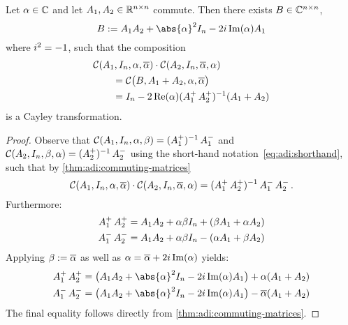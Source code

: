 \begin{lemma}
\label{thm:adi:cayley-compose}
  Let $\alpha\in\mathbb{C}$ and let $A_1, A_2 \in\mathbb{R}^{n\times n}$ commute.
  Then there exists $B\in\mathbb{C}^{n\times n}$,
  \begin{equation*}
    B := A_1A_2 + \abs{\alpha}^2 I_n - 2\im \Im(\alpha) A_1
  \end{equation*}
  where $i^2 = -1$,
  such that the composition
  \begin{align*}
    \MoveEqLeft
    \Cayley(A_1, I_n, \alpha, \conj{\alpha}) \cdot
    \Cayley(A_2, I_n, \conj{\alpha}, \alpha)
    \\
    &= \Cayley\big( B, A_1 + A_2, \alpha, \conj\alpha \big) \\
    &= I_n - 2\Re(\alpha)(\Aip\Aiip)^{-1}(A_1+A_2)
  \end{align*}
  is a Cayley transformation.
\end{lemma}
\begin{proof}
  Observe that
  $\mathcal{C}(A_1, I_n, \alpha, \beta) = \mathop{(\mathop{A_1^+})^{-1}}\mathop{A_1^-}$ and
  $\mathcal{C}(A_2, I_n, \beta, \alpha) = \mathop{(\mathop{A_2^+})^{-1}}\mathop{A_2^-}$
  using the short-hand notation~\eqref{eq:adi:shorthand},
  such that by \autoref{thm:adi:commuting-matrices}
  \begin{equation*}
    \Cayley(A_1, I_n, \alpha, \conj{\alpha})
    \cdot
    \Cayley(A_2, I_n, \conj{\alpha}, \alpha)
    =
    (\Aip\Aiip)^{-1} \Aim\Aiim
    .
  \end{equation*}
  Furthermore:
  \begin{align*}
    \mathop{A_1^+}\mathop{A_2^+} &= A_1A_2 + \alpha\beta I_n + (\beta A_1 + \alpha A_2) \\
    \mathop{A_1^-}\mathop{A_2^-} &= A_1A_2 + \alpha\beta I_n - (\alpha A_1 + \beta A_2)
  \end{align*}
  Applying $\beta := \conj\alpha$ as well as $\alpha = \conj\alpha + 2\im\Im(\alpha)$ yields:
  \begin{align*}
    \Aip\Aiip &= \big(A_1A_2 + \abs{\alpha}^2 I_n - 2\im\Im(\alpha)A_1\big) + \alpha (A_1+A_2) \\
    \Aim\Aiim &= \big(A_1A_2 + \abs{\alpha}^2 I_n - 2\im\Im(\alpha)A_1\big) - \conj\alpha (A_1+A_2)
  \end{align*}
  The final equality follows directly from \autoref{thm:adi:commuting-matrices}.
\end{proof}


